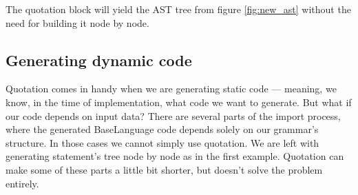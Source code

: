 The quotation block will yield the AST tree from figure \ref{fig:new_ast} without the need for building it node by node.

\subsection{Generating dynamic code}

Quotation comes in handy when we are generating static code --- meaning, we know, in the time of implementation, what code we want to generate.
But what if our code depends on input data?
There are several parts of the import process, where the generated BaseLanguage code depends solely on our grammar's structure.
In those cases we cannot simply use quotation.
We are left with generating statement's tree node by node as in the first example.
Quotation can make some of these parts a little bit shorter, but doesn't solve the problem entirely.